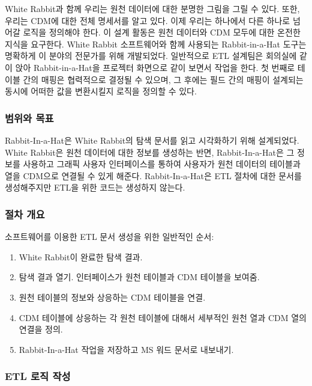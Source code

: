 \documentclass[10.5pt]{book}
\providecommand{\tightlist}{%
  \setlength{\itemsep}{0pt}\setlength{\parskip}{0pt}}
\theoremstyle{definition}
\theoremstyle{definition}
\theoremstyle{definition}
\theoremstyle{remark}
\begin{document}
White Rabbit과 함께 우리는 원천 데이터에 대한 분명한 그림을 그릴 수
있다. 또한, 우리는 CDM에 대한 전체 명세서를 알고 있다. 이제 우리는
하나에서 다른 하나로 넘어갈 로직을 정의해야 한다. 이 설계 활동은 원천
데이터와 CDM 모두에 대한 온전한 지식을 요구한다. White Rabbit
소프트웨어와 함께 사용되는 Rabbit-in-a-Hat 도구는 명확하게 이 분야의
전문가를 위해 개발되었다. 일반적으로 ETL 설계팀은 회의실에 같이 앉아
Rabbit-in-a-Hat을 프로젝터 화면으로 같이 보면서 작업을 한다. 첫 번째로
테이블 간의 매핑은 협력적으로 결정될 수 있으며, 그 후에는 필드 간의
매핑이 설계되는 동시에 어떠한 값을 변환시킬지 로직을 정의할 수 있다.
 

\subsubsection*{범위와 목표}\label{--1}

Rabbit-In-a-Hat은 White Rabbit의 탐색 문서를 읽고 시각화하기 위해
설계되었다. White Rabbit은 원천 데이터에 대한 정보를 생성하는 반면,
Rabbit-In-a-Hat은 그 정보를 사용하고 그래픽 사용자 인터페이스를 통하여
사용자가 원천 데이터의 테이블과 열을 CDM으로 연결될 수 있게 해준다.
Rabbit-In-a-Hat은 ETL 절차에 대한 문서를 생성해주지만 ETL을 위한 코드는
생성하지 않는다.

\subsubsection*{절차 개요}\label{--1}

소프트웨어를 이용한 ETL 문서 생성을 위한 일반적인 순서:

\begin{enumerate}
\def\labelenumi{\arabic{enumi}.}
\tightlist
\item
  White Rabbit이 완료한 탐색 결과.
\item
  탐색 결과 열기. 인터페이스가 원천 테이블과 CDM 테이블을 보여줌.
\item
  원천 테이블의 정보와 상응하는 CDM 테이블을 연결.
\item
  CDM 테이블에 상응하는 각 원천 테이블에 대해서 세부적인 원천 열과 CDM
  열의 연결을 정의.
\item
  Rabbit-In-a-Hat 작업을 저장하고 MS 워드 문서로 내보내기.
\end{enumerate}

\subsubsection*{ETL 로직 작성}\label{etl--}
\end{document}
